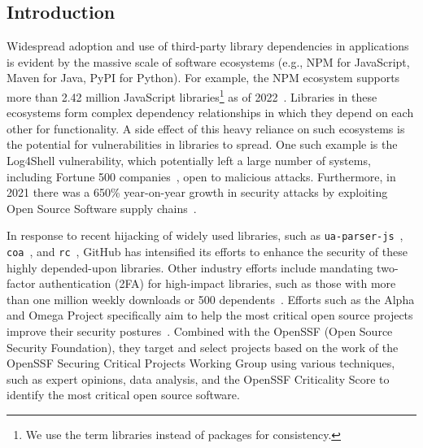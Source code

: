 \documentclass[sigconf,screen]{acmart}
\begin{document}
\begin{sloppy}
\maketitle


\section{Introduction}
Widespread adoption and use of third-party library dependencies in applications is evident by the massive scale of software ecosystems (e.g., NPM for JavaScript, Maven for Java, PyPI for Python).
For example, the NPM ecosystem supports more than 2.42 million JavaScript libraries\footnote{We use the term libraries instead of packages for consistency.} as of 2022~\citep{Librarie95:online}.
Libraries in these ecosystems form complex dependency relationships in which they depend on each other for functionality.
A side effect of this heavy reliance on such ecosystems is the potential for vulnerabilities in libraries to spread.
One such example is the Log4Shell vulnerability, which potentially left a large number of systems, including Fortune 500 companies~\citep{YfryTchs40:online}, open to malicious attacks.
Furthermore, in 2021 there was a 650\% year-on-year growth in security attacks by exploiting Open Source Software supply chains~\citep{Sonatype12:online}.

In response to recent hijacking of widely used libraries, such as \texttt{ua-parser-js}~\citep{faisalma21:online}, \texttt{coa}~\citep{vegedcoa43:online}, and \texttt{rc}~\citep{dominict15:online}, GitHub has intensified its efforts to enhance the security of these highly depended-upon libraries.
Other industry efforts include mandating two-factor authentication (2FA) for high-impact libraries, such as those with more than one million weekly downloads or 500 dependents~\citep{Top100np77:online}.
Efforts such as the Alpha and Omega Project specifically aim to help the most critical open source projects improve their security postures~\citep{AlphaOme74:online}.
Combined with the OpenSSF (Open Source Security Foundation), they target and select projects based on the work of the OpenSSF Securing Critical Projects Working Group using various techniques, such as expert opinions, data analysis, and the OpenSSF Criticality Score to identify the most critical open source software.



\end{sloppy}
\end{document}
